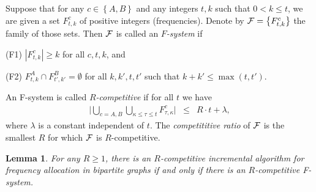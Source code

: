 \documentclass[11pt]{article}
\newcommand{\calF}{{\cal F}}
\newcommand{\braced}[1]{{ \left\{ #1 \right\} }}
\newcommand{\bigbrace}[1]{{ \big\{ #1 \big\} }}
\newcommand{\Bigbars}[1]{{ \Big| #1 \Big| }}
\newtheorem{lemma}[theorem]{Lemma}
\begin{document}
Suppose that for any $c\in\braced{A,B}$ and any integers
$t,k$ such that $0 < k \le t$, we are given a set
$F^c_{t,k}$ of positive integers (frequencies).
Denote by $\calF = \bigbrace{F^c_{t,k}}$ the family of those sets.
Then $\calF$ is called an \emph{$F$-system} if
\begin{description}
	\item{(F1)} $|F^c_{t,k}| \ge k$ for all $c,t,k$, and
	\item{(F2)} $F^A_{t,k} \cap F^B_{t',k'} = \emptyset$ 
	 	for all	$k,k',t,t'$ such that $k+k'\le \max(t,t')$.
\end{description}
An F-system is called \emph{$R$-competitive} if
for all $t$ we have
\begin{eqnarray}
	\Bigbars{ \bigcup_{c=A,B}\bigcup_{\kappa \le \tau\le t} F^c_{\tau,\kappa} }
			&\le& R\cdot t + \lambda,
			\label{eqn: def rho-competitive}
\end{eqnarray}
where $\lambda$ is a constant independent of $t$.
The \emph{competititive ratio} of $\calF$ is the smallest $R$ for
which $\calF$ is $R$-competitive.



\begin{lemma}\label{lem: incr alg equiv f-system}
For any $R\ge 1$, there is an $R$-competitive incremental algorithm
for frequency allocation in bipartite graphs if and only if there
is an $R$-competitive F-system.
\end{lemma}
\end{document}
